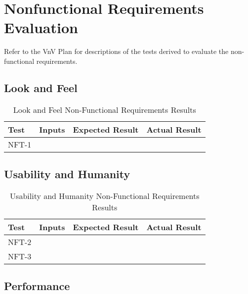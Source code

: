 \documentclass[12pt, titlepage]{article}
\begin{document}
\section{Nonfunctional Requirements Evaluation}
Refer to the VnV Plan for descriptions of the tests derived to evaluate the non-functional requirements.

\subsection{Look and Feel}

\begin{table}[H]
  \centering
    \setlength{\leftmargini}{0cm}
    \begin{tabular}{| >{\centering\arraybackslash}m{1.5cm} | 
      >{\centering\arraybackslash}m{4cm} | 
      >{\centering\arraybackslash}m{4cm} | 
      >{\centering\arraybackslash}m{4cm} |}
    \hline
    \rowcolor[gray]{0.9}
    Test & Inputs & Expected Result & Actual Result\\
    \hline
    NFT-1 &  &  & \\
    \hline
    \end{tabular}
  \caption{Look and Feel Non-Functional Requirements Results}
\end{table}
		
\subsection{Usability and Humanity}

\begin{table}[H]
  \centering
    \setlength{\leftmargini}{0cm}
    \begin{tabular}{| >{\centering\arraybackslash}m{1.5cm} | 
      >{\centering\arraybackslash}m{4cm} | 
      >{\centering\arraybackslash}m{4cm} | 
      >{\centering\arraybackslash}m{4cm} |}
    \hline
    \rowcolor[gray]{0.9}
    Test & Inputs & Expected Result & Actual Result\\
    \hline
    NFT-2 &  &  & \\
    \hline
    NFT-3 &  &  & \\
    \hline
    \end{tabular}
  \caption{Usability and Humanity Non-Functional Requirements Results}
\end{table}

\subsection{Performance}
\end{document}
